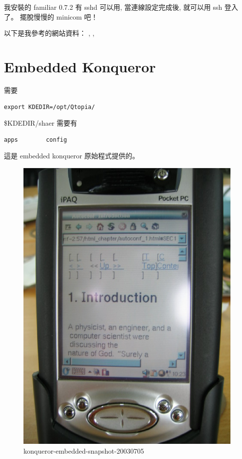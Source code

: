 \documentclass[12pt,a4paper]{article}
\begin{document}
\begin{CJK}{UTF8}{cwmu}
我安裝的 familiar 0.7.2 有 sshd 可以用,
當連線設定完成後, 就可以用 ssh 登入了。
擺脫慢慢的 minicom 吧！

以下是我參考的網站資料：
\cite{ethernet_usb}, \cite{ZAURUS}, \cite{usb_driver}


\section{Embedded Konqueror}
需要 
\begin{verbatim}
export KDEDIR=/opt/Qtopia/
\end{verbatim}

\$KDEDIR/shaer 需要有
\begin{verbatim}
apps        config 
\end{verbatim}
這是 embedded konqueror 原始程式提供的。


\begin{figure}[htbp]
\centering
\includegraphics[scale=0.3]{eps/konqueror.eps}
\caption{konqueror-embedded-snapshot-20030705}
\end{figure}


\end{CJK}
\end{document}
